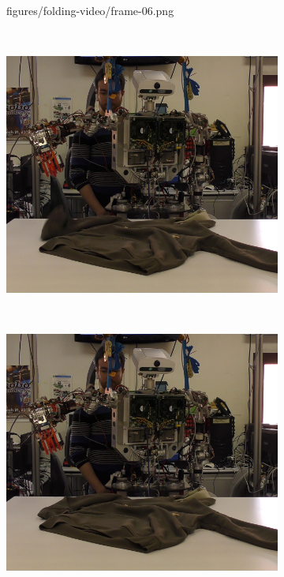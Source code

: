 \begin{figure}[htbp]
\begin{subfigure}[c]{\videofigurewidth}
    	{figures/folding-video/frame-06.png}  	
	\end{subfigure}
	~
    \begin{subfigure}[c]{\videofigurewidth}
	    \centering
    	\includegraphics[width=\textwidth]
    	{figures/folding-video/frame-07.png}
	\end{subfigure}
	~
    \begin{subfigure}[c]{\videofigurewidth}
	    \centering
    	\includegraphics[width=\textwidth]
    	{figures/folding-video/frame-08.png}
	\end{subfigure} 
    \caption[]
    {}
    \label{fig:video}
\end{figure}